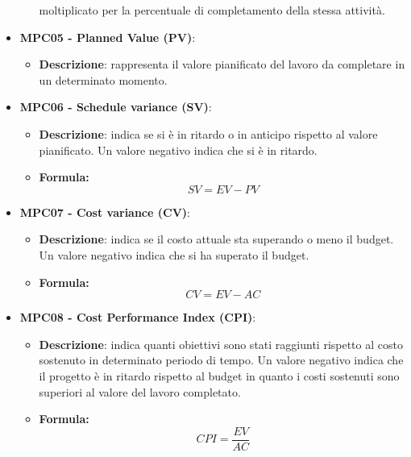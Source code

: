 \documentclass[10pt]{article}
\begin{document}
\begin{justify}
\begin{itemize}
\begin{itemize}
            moltiplicato per la percentuale di completamento della stessa attività.
        \end{itemize}
    \item \textbf{MPC05 - Planned Value (PV)}:
        \begin{itemize}
            \item \textbf{Descrizione}: rappresenta il valore pianificato del lavoro da completare in un determinato momento.
        \end{itemize}
    \item \textbf{MPC06 - Schedule variance (SV)}:
    \begin{itemize}
        \item   \textbf{Descrizione}: indica se si è in ritardo o in anticipo rispetto al valore pianificato. Un valore negativo indica che si è in ritardo.
        \item   \textbf{Formula:}
            \[
            SV = EV - PV
            \]
    \end{itemize}
    \item \textbf{MPC07 - Cost variance (CV)}:
    \begin{itemize}
        \item   \textbf{Descrizione}: indica se il costo attuale sta superando o meno il budget. Un valore negativo indica che si ha superato il budget.
        \item   \textbf{Formula:}
            \[
            CV = EV - AC
            \]
    \end{itemize}
    \item \textbf{MPC08 - Cost Performance Index (CPI)}:
    \begin{itemize}
        \item   \textbf{Descrizione}: indica quanti obiettivi sono stati raggiunti rispetto al costo sostenuto in determinato periodo di tempo. Un valore negativo indica che il progetto è in ritardo rispetto al budget in quanto i costi sostenuti sono superiori al valore del lavoro completato.
        \item   \textbf{Formula:}
            \[
            CPI = \frac{EV}{AC}
            \]
    \end{itemize}
\end{itemize}


\end{justify}
\end{document}
